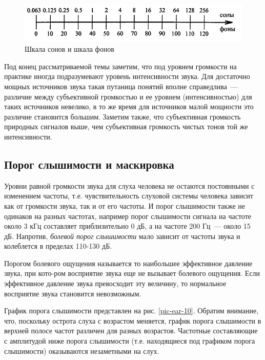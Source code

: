 \documentclass[oneside, final, 14pt]{extreport}
\begin{document}
\begin{figure}[h]
\centering
\includegraphics[scale=0.8]{pic-ear-09}
\caption{Шкала сонов и шкала фонов}
\label{pic-ear-09}
\end{figure}

Под конец рассматриваемой темы заметим, что под уровнем громкости на практике иногда подразумевают уровень интенсивности звука. Для достаточно мощных источников звука такая путаница понятий вполне справедлива~--- различие между субъективной громкостью и ее уровнем (интенсивностью) для таких источников невелико, в то же время для источников малой мощности это различие становится большим. Заметим также, что субъективная громкость природных сигналов выше, чем субъективная громкость чистых тонов той же интенсивности.

\subsection{Порог слышимости и маскировка}
Уровни равной громкости звука для слуха человека не остаются постоянными с изменением частоты, т.е. чувствительность слуховой системы человека зависит как от громкости звука, так и от его частоты. И порог слышимости также не одинаков на разных частотах, например порог слышимости сигнала на частоте около 3 кГц составляет приблизительно 0 дБ, а на частоте 200 Гц~--- около 15 дБ. Напротив, {\itshape болевой порог слышимости} мало зависит от частоты звука и колеблется в пределах 110-130 дБ.

Порогом болевого ощущения называется то наибольшее эффективное давление звука, при кото-ром восприятие звука еще не вызывает болевого ощущения. Если эффективное давление звука превосходит эту величину, то нормальное восприятие звука становится невозможным.

График порога слышимости представлен на рис. \ref{pic-ear-10}. Обратим внимание, что, поскольку острота слуха с возрастом меняется, график порога слышимости в верхней полосе частот различен для разных возрастов. Частотные составляющие с амплитудой ниже порога слышимости (т.е. находящиеся под графиком порога слышимости) оказываются незаметными на слух.
\end{document}
